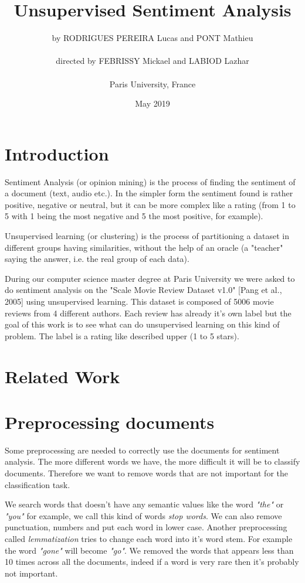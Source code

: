 \documentclass{article}
\title{Unsupervised Sentiment Analysis}
\author{by RODRIGUES PEREIRA Lucas and PONT Mathieu\\\\directed by FEBRISSY Mickael and LABIOD Lazhar\\\\Paris University, France}
\date{May 2019}
\begin{document}
\maketitle




\section{Introduction}

Sentiment Analysis (or opinion mining) is the process of finding the sentiment of a document (text, audio etc.). In the simpler form the sentiment found is rather positive, negative or neutral, but it can be more complex like a rating (from 1 to 5 with 1 being the most negative and 5 the most positive, for example).

Unsupervised learning (or clustering) is the process of partitioning a dataset in different groups having similarities, without the help of an oracle (a "teacher" saying the answer, i.e. the real group of each data).

During our computer science master degree at Paris University we were asked
to do sentiment analysis on the "Scale Movie Review Dataset v1.0" [Pang et al., 2005] using unsupervised learning. This dataset is composed of 5006 movie reviews from 4 different authors. Each review has already it's own label but the goal of this work is to see what can do unsupervised learning on this kind of problem. The label is a rating like described upper (1 to 5 stars).



\section{Related Work}



\section{Preprocessing documents}

Some preprocessing are needed to correctly use the documents for sentiment analysis. The more different words we have, the more difficult it will be to classify documents. Therefore we want to remove words that are not important for the classification task. 

We search words that doesn't have any semantic values like the word \textit{"the"} or \textit{"you"} for example, we call this kind of words \textit{stop words}. We can also remove punctuation, numbers and put each word in lower case. Another preprocessing called \textit{lemmatization} tries to change each word into it's word stem. For example the word \textit{"gone"} will become \textit{"go"}. We removed the words that appears less than 10 times across all the documents, indeed if a word is very rare then it's probably not important.
\end{document}
